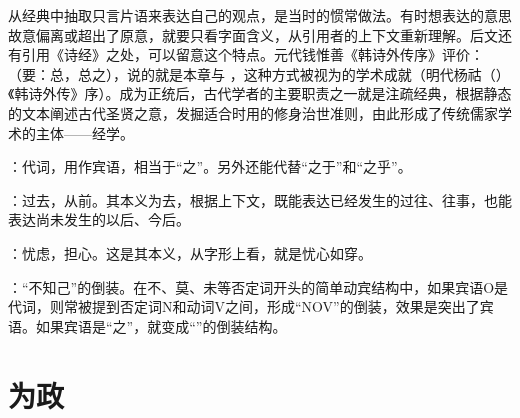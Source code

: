 {\begin{lyblobitemize}
从经典中抽取只言片语来表达自己的观点，是当时的惯常做法。有时想表达的意思故意偏离或超出了原意，就要只看字面含义，从引用者的上下文重新理解。后文还有引用《诗经》之处，可以留意这个特点。元代钱惟善《韩诗外传序》评价：（要：总，总之），说的就是本章与 ，这种方式被视为的学术成就（明代杨祜（）《韩诗外传》序）。成为正统后，古代学者的主要职责之一就是注疏经典，根据静态的文本阐述古代圣贤之意，发掘适合时用的修身治世准则，由此形成了传统儒家学术的主体——经学。

\item {}：代词，用作宾语，相当于“之”。另外还能代替“之于”和“之乎”。
\item {}：过去，从前。其本义为去，根据上下文，既能表达已经发生的过往、往事，也能表达尚未发生的以后、今后。
\end{lyblobitemize}
}
{}


{
\item {}：忧虑，担心。这是其本义，从字形上看，就是忧心如穿。

\item {}：“不知己”的倒装。在不、莫、未等否定词开头的简单动宾结构中，如果宾语O是代词，则常被提到否定词N和动词V之间，形成“NOV”的倒装，效果是突出了宾语。如果宾语是“之”，就变成“”的倒装结构。
}
{}


\chapter{为政}

